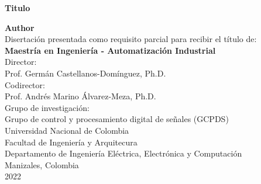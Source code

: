 \begin{center}

    \thispagestyle{empty} 
    \vspace*{2cm} 
    
    \begin{spacing}{1.9} 
        \textbf{\huge Titulo}\\[1.0cm]
    \end{spacing}

    \Large
        \textbf{Author}\\[2.0cm]
    
    \small 
        Disertación presentada como requisito parcial para recibir el título de:\\
        \textbf{Maestría en Ingeniería - Automatización Industrial}\\[1cm]
        
        Director:\\
        Prof. Germán Castellanos-Domínguez, Ph.D.\\[0.25cm]
        
        Codirector:\\
        Prof. Andrés Marino Álvarez-Meza, Ph.D.\\[1cm]
        
        Grupo de investigación:\\
        Grupo de control y procesamiento digital de señales (GCPDS)\\[1cm]
        
        Universidad Nacional de Colombia\\
        Facultad de Ingeniería y Arquitecura\\ 
        Departamento de Ingeniería Eléctrica, Electrónica y Computación\\
        Manizales, Colombia\\
        2022\\

\end{center}




\restoregeometry 